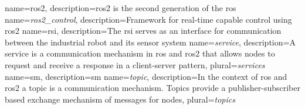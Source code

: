 {
    name={\gls{ros2}},
    description={\acrlong{ros2} is the second generation of the \acrlong{ros} \cite{macenski_robot_2022}}
}
{
    name={\textit{ros2\_control}},
    description={Framework for real-time capable control using \gls{ros2}}
}
{
    name={\gls{rsi}},
    description={The \acrlong{rsi} serves as an interface for communication between the industrial robot and its sensor system }
}
{
    name={\textit{service}},
    description={A service is a communication mechanism in \gls{ros} and \gls{ros2} that allows \glspl{node} to request and receive a response in a client-server pattern},
    plural={\textit{services}}
}
{
    name={\gls{sm}},
    description={\acrlong{sm}}
}
{
    name={\textit{topic}},
    description={In the context of \gls{ros} and \gls{ros2} a topic is a communication mechanism. Topics provide a publisher-subscriber based exchange mechanism of \glspl{message} for \glspl{node}},
    plural={\textit{topics}}
}